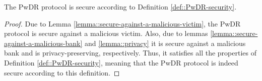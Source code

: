 \begin{theorem}
The PwDR protocol is secure according to Definition \ref{def::PwDR-security}.
\end{theorem}



\begin{proof}
Due to Lemma \ref{lemma::secure-against-a-malicious-victim}, the PwDR protocol is secure against a malicious victim. Also, due to lemmas \ref{lemma::secure-against-a-malicious-bank} and \ref{lemma::privacy} it is  secure against a malicious bank and is privacy-preserving, respectively. Thus, it satisfies all the properties of Definition \ref{def::PwDR-security}, meaning that the PwDR protocol is indeed secure according to this definition. 
\end{proof}



